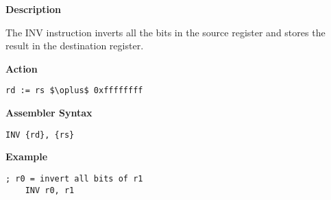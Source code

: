 \textbf{Description}

The INV instruction inverts all the bits in the source register and stores the result in the destination register.

\vspace{3ex}

\textbf{Action}
\begin{lstlisting}[frame=single]
	rd := rs $\oplus$ 0xffffffff
\end{lstlisting}

\vspace{3ex}

\textbf{Assembler Syntax}
\begin{lstlisting}[frame=single]
	INV {rd}, {rs}
\end{lstlisting}

\vspace{3ex}

\textbf{Example}
\begin{lstlisting}[frame=single]
	; r0 = invert all bits of r1
	INV r0, r1
\end{lstlisting}